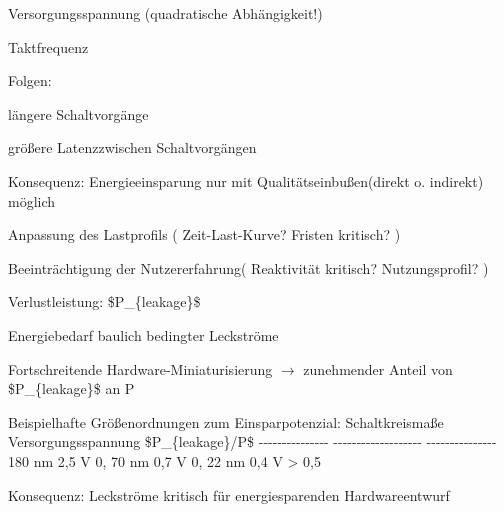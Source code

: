 \documentclass[a4paper]{article}
\begin{document}
\begin{multicols}{3}
\begin{itemize*}
\begin{enumerate*}
            \item Versorgungsspannung (quadratische Abhängigkeit!)
            \item Taktfrequenz
        \end{enumerate*}
        \item
        Folgen:
        \begin{enumerate*}

            \item längere Schaltvorgänge
            \item größere Latenzzwischen Schaltvorgängen
        \end{enumerate*}
        \item
        Konsequenz: Energieeinsparung nur mit Qualitätseinbußen(direkt o.
        indirekt) möglich
        \begin{itemize*}
            \item Anpassung des Lastprofils ( Zeit-Last-Kurve? Fristen kritisch? )
            \item Beeinträchtigung der Nutzererfahrung( Reaktivität kritisch? Nutzungsprofil? )
        \end{itemize*}
    \end{itemize*}

    Verlustleistung: \$P\_\{leakage\}\$

    \begin{itemize*}
        \item
        Energiebedarf baulich bedingter Leckströme
        \item
        Fortschreitende Hardware-Miniaturisierung
        $\rightarrow$ zunehmender Anteil von
        \$P\_\{leakage\}\$ an P
        \item
        Beispielhafte Größenordnungen zum Einsparpotenzial: \textbar{}
        Schaltkreismaße \textbar{} Versorgungsspannung \textbar{}
        \$P\_\{leakage\}/P\$ \textbar{} \textbar{}
        -\/-\/-\/-\/-\/-\/-\/-\/-\/-\/-\/-\/-\/-\/- \textbar{}
        -\/-\/-\/-\/-\/-\/-\/-\/-\/-\/-\/-\/-\/-\/-\/-\/-\/-\/- \textbar{}
        -\/-\/-\/-\/-\/-\/-\/-\/-\/-\/-\/-\/-\/-\/- \textbar{} \textbar{} 180
        nm \textbar{} 2,5 V \textbar{} 0, \textbar{} \textbar{} 70 nm
        \textbar{} 0,7 V \textbar{} 0, \textbar{} \textbar{} 22 nm \textbar{}
        0,4 V \textbar{} \textgreater{} 0,5 \textbar{}
        \item
        Konsequenz: Leckströme kritisch für energiesparenden Hardwareentwurf
    \end{itemize*}



\end{multicols}
\end{document}
